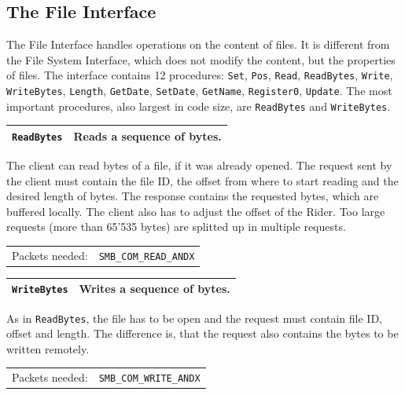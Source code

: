 \documentclass[11pt,a4paper]{book}
\begin{document}
\subsection{The File Interface}
The File Interface handles operations on the content of files. It is different from the File System Interface, which does not modify the content, but the properties of files. The interface contains 12 procedures: \texttt{Set}, \texttt{Pos}, \texttt{Read}, \texttt{ReadBytes}, \texttt{Write}, \texttt{WriteBytes}, \texttt{Length}, \texttt{GetDate}, \texttt{SetDate}, \texttt{GetName}, \texttt{Register0}, \texttt{Update}. The most important procedures, also largest in code size, are \texttt{ReadBytes} and \texttt{WriteBytes}.

\newpage 

\begin{center}
\renewcommand{\tabcolsep}{5mm}
\begin{tabular}{p{3cm}p{8cm}}
\texttt{ReadBytes} & \textbf{Reads a sequence of bytes.} \\ 
\hline
\end{tabular}
\end{center}
The client can read bytes of a file, if it was already opened. The request sent by the client must contain the file ID, the offset from where to start reading and the desired length of bytes. The response contains the requested bytes, which are buffered locally. The client also has to adjust the offset of the Rider. Too large requests (more than 65'535 bytes) are splitted up in multiple requests. \\
\renewcommand{\tabcolsep}{5mm}
\begin{tabular}{p{3cm}p{8cm}}
Packets needed: & \texttt{SMB\_COM\_READ\_ANDX} \\
\end{tabular}

\begin{center}
\renewcommand{\tabcolsep}{5mm}
\begin{tabular}{p{3cm}p{8cm}}
\texttt{WriteBytes} & \textbf{Writes a sequence of bytes.} \\ 
\hline
\end{tabular}
\end{center}
As in \texttt{ReadBytes}, the file has to be open and the request must contain file ID, offset and length. The difference is, that the request also contains the bytes to be written remotely. \\
\renewcommand{\tabcolsep}{5mm}
\begin{tabular}{p{3cm}p{8cm}}
Packets needed: & \texttt{SMB\_COM\_WRITE\_ANDX} \\
\end{tabular} \\
\end{document}
